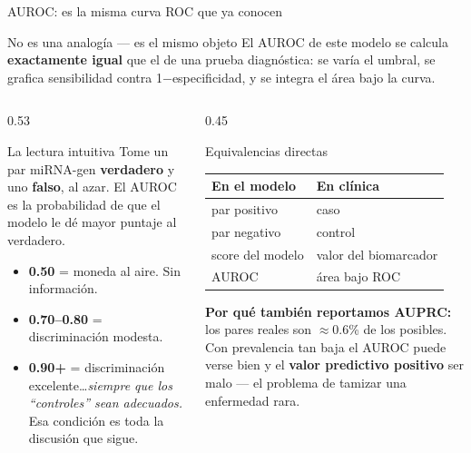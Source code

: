
\begin{frame}{AUROC: es la misma curva ROC que ya conocen}
  \begin{block}{No es una analog\'ia --- es el mismo objeto}
    \small
    El AUROC de este modelo se calcula \textbf{exactamente igual} que el de una prueba diagn\'ostica: se var\'ia el umbral, se grafica sensibilidad contra 1$-$especificidad, y se integra el \'area bajo la curva.
  \end{block}

  \vspace{0.4em}

  \begin{columns}[T]
    \begin{column}{0.53\textwidth}
      \small
      \begin{block}{La lectura intuitiva}
        Tome un par miRNA-gen \textbf{verdadero} y uno \textbf{falso}, al azar. El AUROC es la probabilidad de que el modelo le d\'e mayor puntaje al verdadero.
      \end{block}
      \begin{itemize}
        \small
        \item \textbf{0.50} = moneda al aire. Sin informaci\'on.
        \item \textbf{0.70--0.80} = discriminaci\'on modesta.
        \item \textbf{0.90+} = discriminaci\'on excelente\ldots \emph{siempre que los ``controles'' sean adecuados.} Esa condici\'on es toda la discusi\'on que sigue.
      \end{itemize}
    \end{column}
    \begin{column}{0.45\textwidth}
      \begin{block}{Equivalencias directas}
        \scriptsize
        \begin{tabular}{@{}ll@{}}
          \toprule
          \textbf{En el modelo} & \textbf{En cl\'inica} \\
          \midrule
          par positivo & caso \\
          par negativo & control \\
          score del modelo & valor del biomarcador \\
          AUROC & \'area bajo ROC \\
          \bottomrule
        \end{tabular}
      \end{block}
      \scriptsize
      \textbf{Por qu\'e tambi\'en reportamos AUPRC:} los pares reales son $\approx$0.6\% de los posibles. Con prevalencia tan baja el AUROC puede verse bien y el \textbf{valor predictivo positivo} ser malo --- el problema de tamizar una enfermedad rara.
    \end{column}
  \end{columns}
\end{frame}

